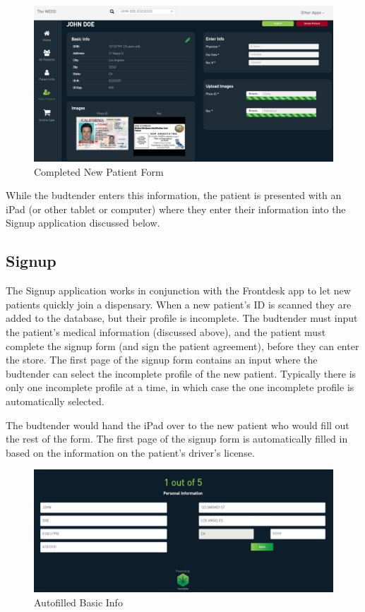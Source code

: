 \documentclass[]{book}
\theoremstyle{definition}
\theoremstyle{definition}
\theoremstyle{definition}
\theoremstyle{remark}
\begin{document}
\begin{figure}
\centering
\includegraphics{images/newPatient2.png}
\caption{Completed New Patient Form}
\end{figure}

While the budtender enters this information, the patient is presented
with an iPad (or other tablet or computer) where they enter their
information into the Signup application discussed below.

\subsection{Signup}\label{signup}

The Signup application works in conjunction with the Frontdesk app to
let new patients quickly join a dispensary. When a new patient's ID is
scanned they are added to the database, but their profile is incomplete.
The budtender must input the patient's medical information (discussed
above), and the patient must complete the signup form (and sign the
patient agreement), before they can enter the store. The first page of
the signup form contains an input where the budtender can select the
incomplete profile of the new patient. Typically there is only one
incomplete profile at a time, in which case the one incomplete profile
is automatically selected.

The budtender would hand the iPad over to the new patient who would fill
out the rest of the form. The first page of the signup form is
automatically filled in based on the information on the patient's
driver's license.

\begin{figure}
\centering
\includegraphics{images/S1.png}
\caption{Autofilled Basic Info}
\end{figure}
\end{document}
